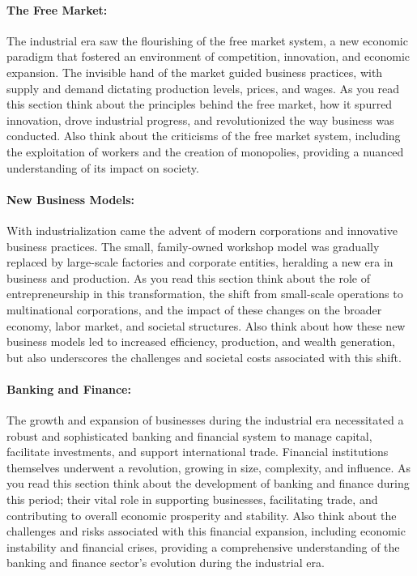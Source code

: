 \documentclass[a4paper,12pt]{book}
\begin{document}
\paragraph{The Free Market:}
The industrial era saw the flourishing of the free market system, a new economic paradigm that fostered an environment of competition, innovation, and economic expansion. The invisible hand of the market guided business practices, with supply and demand dictating production levels, prices, and wages. As you read this section think about the principles behind the free market, how it spurred innovation, drove industrial progress, and revolutionized the way business was conducted. Also think about the criticisms of the free market system, including the exploitation of workers and the creation of monopolies, providing a nuanced understanding of its impact on society.

\paragraph{New Business Models:}
With industrialization came the advent of modern corporations and innovative business practices. The small, family-owned workshop model was gradually replaced by large-scale factories and corporate entities, heralding a new era in business and production. As you read this section think about the role of entrepreneurship in this transformation, the shift from small-scale operations to multinational corporations, and the impact of these changes on the broader economy, labor market, and societal structures. Also think about how these new business models led to increased efficiency, production, and wealth generation, but also underscores the challenges and societal costs associated with this shift.

\paragraph{Banking and Finance:}
The growth and expansion of businesses during the industrial era necessitated a robust and sophisticated banking and financial system to manage capital, facilitate investments, and support international trade. Financial institutions themselves underwent a revolution, growing in size, complexity, and influence. As you read this section think about the development of banking and finance during this period; their vital role in supporting businesses, facilitating trade, and contributing to overall economic prosperity and stability. Also think about the challenges and risks associated with this financial expansion, including economic instability and financial crises, providing a comprehensive understanding of the banking and finance sector’s evolution during the industrial era.
\end{document}
